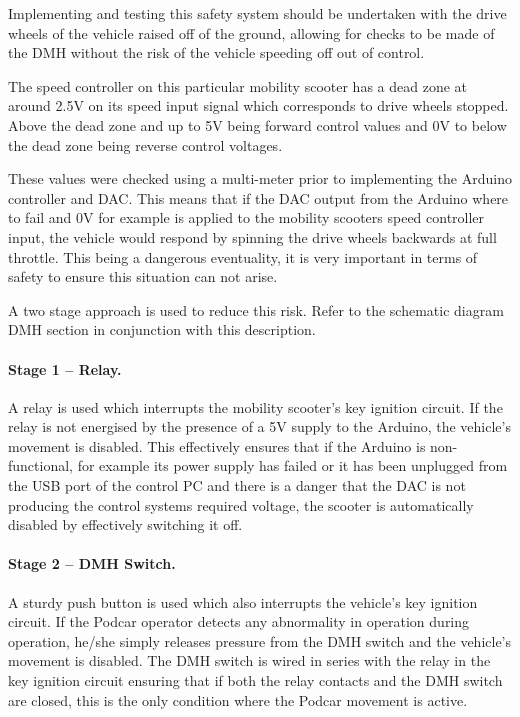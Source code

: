 \documentclass[a4paper]{article}
\begin{document}
Implementing and testing this safety system should be undertaken with the drive wheels of the vehicle raised off of the ground, allowing for checks to be made of the DMH without the risk of the vehicle speeding off out of control.

The speed controller on this particular mobility scooter has a dead zone at around 2.5V on its speed input signal which corresponds to drive wheels stopped. Above the dead zone and up to 5V being forward control values and 0V to below the dead zone being reverse control voltages.

These values were checked using a multi-meter prior to implementing the Arduino controller and DAC.  This means that if the DAC output from the Arduino where to fail and 0V for example is applied to the mobility scooters speed controller input, the vehicle would respond by spinning the drive wheels backwards at full throttle. This being a dangerous eventuality, it is very important in terms of safety to ensure this situation can not arise.

A two stage approach is used to reduce this risk. Refer to the schematic diagram DMH section in conjunction with this description.

\paragraph{Stage 1 – Relay.} A relay is used which interrupts the mobility scooter’s key ignition circuit. If the relay is not energised by the presence of a 5V supply to the Arduino, the vehicle’s movement is disabled. This effectively ensures that if the Arduino is non-functional, for example its power supply has failed or it has been unplugged from the USB port of the control PC and there is a danger that the DAC is not producing the control systems required voltage, the scooter is automatically disabled by effectively switching it off.

\paragraph{Stage 2 – DMH Switch.} A sturdy push button is used which also interrupts the vehicle's key ignition circuit. If the Podcar operator detects any abnormality in operation during operation, he/she simply releases pressure from the DMH switch and the vehicle’s movement is disabled. The DMH switch is wired in series with the relay in the key ignition circuit ensuring that if both the relay contacts and the DMH switch are closed, this is the only condition where the Podcar movement is active.
\end{document}
